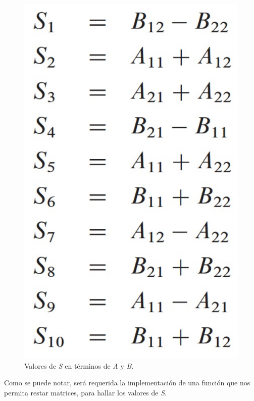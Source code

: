 \documentclass{article}
\begin{document}
\begin{figure}[h]
    \begin{minipage}{1\textwidth}
        \centering
        \includegraphics[scale=0.25]{Imagen4.png}
        \caption{Valores de \textit{S} en términos de \textit{A} y \textit{B}.}
        \label{1}
    \end{minipage}
\end{figure}

Como se puede notar, será requerida la implementación de una función que nos permita restar matrices, para hallar los valores de \textit{S}.\\
\end{document}
